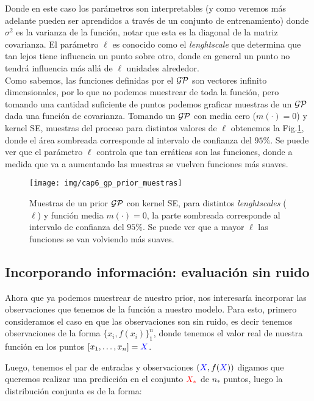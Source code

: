Donde en este caso los parámetros son interpretables (y como veremos más adelante pueden ser aprendidos a través de un conjunto de entrenamiento) donde $\sigma^2$ es la varianza de la función, notar que esta es la diagonal de la matriz covarianza. El parámetro $\ell$ es conocido como el \textit{lenghtscale} que determina que tan lejos tiene influencia un punto sobre otro, donde en general un punto no tendrá influencia más allá de $\ell$ unidades alrededor.\\

Como sabemos, las funciones definidas por el $\mathcal{GP}$ son vectores infinito dimensionales, por lo que no podemos muestrear de toda la función, pero tomando una cantidad suficiente de puntos podemos graficar muestras de un $\mathcal{GP}$ dada una función de covarianza. Tomando un $\mathcal{GP}$ con media cero ($m(\cdot)=0$) y kernel SE, muestras del proceso para distintos valores de $\ell$ obtenemos la Fig.\ref{fig:gp_1}, donde el área sombreada corresponde al intervalo de confianza del $95\%$. Se puede ver que el parámetro $\ell$ controla que tan erráticas son las funciones, donde a medida que va a aumentando las muestras se vuelven funciones más suaves.

\begin{figure}[H]
	\centering
	\texttt{[image: img/cap6\_gp\_prior\_muestras]}
	\caption{Muestras de un prior $\mathcal{GP}$ con kernel SE, para distintos \textit{lenghtscales} ($\ell$) y función media $m(\cdot)=0$, la parte sombreada corresponde al intervalo de confianza del $95\%$. Se puede ver que a mayor $\ell$ las funciones se van volviendo más suaves.}
	\label{fig:gp_1}
\end{figure}

\subsection{Incorporando información: evaluación sin ruido}

Ahora que ya podemos muestrear de nuestro prior, nos interesaría incorporar las observaciones que tenemos de la función a nuestro modelo. Para esto, primero consideramos el caso en que las observaciones son sin ruido, es decir tenemos observaciones de la forma $\{x_i, f(x_i)\}_{1}^{n}$, donde tenemos el valor real de nuestra función en los puntos $[x_1, \ldots, x_n]=\textcolor{blue}{X}$. 

Luego, tenemos el par de entradas y observaciones $\left(\textcolor{blue}{X}, f(\textcolor{blue}{X})\right)$ digamos que queremos realizar una predicción en el conjunto $\textcolor{red}{X_*}$ de $n_*$ puntos, luego la distribución conjunta es de la forma:

